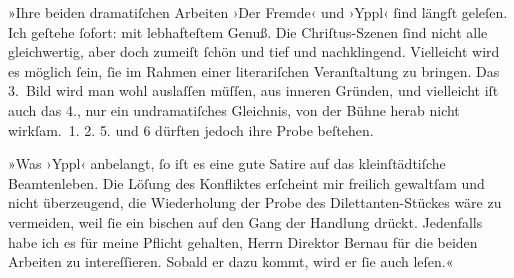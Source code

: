 \pstart
           »Ihre beiden dramatiſchen Arbeiten ›Der Fremde‹
               und ›Yppl‹{ }ſind längſt geleſen. Ich geſtehe{ }ſofort: mit lebhafteſtem Genuß. Die Chriſtus-Szenen{ }ſind nicht alle gleichwertig, aber doch zumeiſt{ }ſchön und tief
               und nachklingend. Vielleicht wird es möglich{ }ſein,{ }ſie im Rahmen einer {\pb}literariſchen Veranſtaltung zu bringen.
               Das 3. Bild wird man wohl auslaſſen müſſen, aus inneren Gründen, und vielleicht iſt
               auch das 4., nur ein undramatiſches Gleichnis, von der Bühne herab nicht
                  wirkſam. 1.{ }2.{ }5. und 6 dürften jedoch ihre Probe beſtehen.\pend
           
\pstart
           »Was ›Yppl‹ anbelangt,{ }ſo iſt es eine gute
               Satire auf das kleinſtädtiſche Beamtenleben. Die Löſung des Konfliktes erſcheint mir
               freilich gewaltſam und nicht überzeugend, die Wiederholung der Probe des
               Dilettanten-Stückes wäre zu vermeiden, weil{ }ſie ein bischen auf den Gang der Handlung
               drückt. Jedenfalls habe ich es für meine Pflicht gehalten, Herrn Direktor Bernau für die beiden Arbeiten zu intereſſieren.
               Sobald er dazu kommt, wird er{ }ſie auch leſen.«\pend
           
